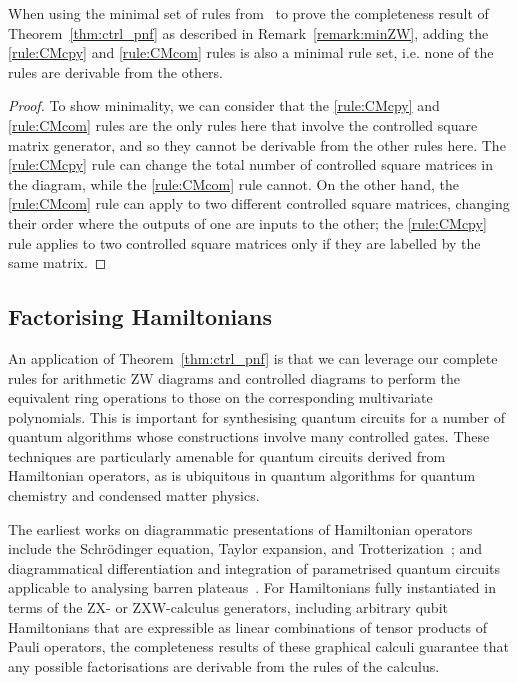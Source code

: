 \begin{prop}\label{prop:ctrl_pnf_min}
    When using the minimal set of rules from~\cite{deVisme2025minzw} to prove the completeness result of Theorem~\ref{thm:ctrl_pnf} as described in Remark~\ref{remark:minZW}, adding the \ref{rule:CMcpy} and \ref{rule:CMcom} rules is also a minimal rule set, i.e. none of the rules are derivable from the others.
\end{prop}
\begin{proof}
    To show minimality, we can consider that the \ref{rule:CMcpy} and \ref{rule:CMcom} rules are the only rules here that involve the controlled square matrix generator, and so they cannot be derivable from the other rules here.
    The \ref{rule:CMcpy} rule can change the total number of controlled square matrices in the diagram, while the \ref{rule:CMcom} rule cannot.
    On the other hand, the \ref{rule:CMcom} rule can apply to two different controlled square matrices, changing their order where the outputs of one are inputs to the other; the \ref{rule:CMcpy} rule applies to two controlled square matrices only if they are labelled by the same matrix.
\end{proof}

\subsection{Factorising Hamiltonians}
An application of Theorem~\ref{thm:ctrl_pnf} is that we can leverage our complete rules for arithmetic ZW diagrams and controlled diagrams to perform the equivalent ring operations to those on the corresponding multivariate polynomials.
This is important for synthesising quantum circuits for a number of quantum algorithms whose constructions involve many controlled gates.
These techniques are particularly amenable for quantum circuits derived from Hamiltonian operators, as is ubiquitous in quantum algorithms for quantum chemistry and condensed matter physics.

The earliest works on diagrammatic presentations of Hamiltonian operators include the Schr\"odinger equation, Taylor expansion, and Trotterization~\cite{shaikh2022sum}; and diagrammatical differentiation and integration of parametrised quantum circuits applicable to analysing barren plateaus~\cite{Wang2024diffintzx}.
For Hamiltonians fully instantiated in terms of the ZX- or ZXW-calculus generators, including arbitrary qubit Hamiltonians that are expressible as linear combinations of tensor products of Pauli operators, the completeness results of these graphical calculi guarantee that any possible factorisations are derivable from the rules of the calculus.

